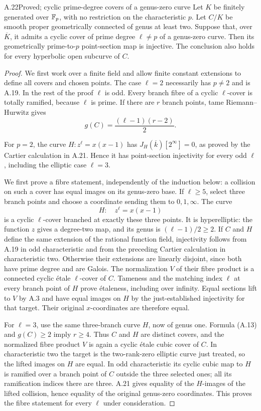 \begin{claim}{A.22}{Proved; cyclic prime-degree covers of a genus-zero curve}
Let $K$ be finitely generated over $\mathbb F_p$, with no restriction
on the characteristic $p$.
Let $C/K$ be smooth proper geometrically connected of genus
at least two. Suppose that, over $\overline K$, it admits a
cyclic cover of prime degree $\ell\ne p$ of a genus-zero
curve. Then its geometrically prime-to-$p$ point-section map
is injective. The conclusion also holds for every hyperbolic
open subcurve of $C$.
\end{claim}
\begin{proof}
We first work over a finite field and allow finite constant
extensions to define all covers and chosen points. The case
$\ell=2$ necessarily has $p\ne2$ and is A.19. In the rest
of the proof $\ell$ is odd.
Every branch fibre of a cyclic $\ell$-cover is totally
ramified, because $\ell$ is prime. If there are $r$ branch
points, tame Riemann--Hurwitz gives
\[
 g(C)=\frac{(\ell-1)(r-2)}2.                                  \tag{A.13}
\]

For $p=2$, the curve $H:z^\ell=x(x-1)$ has
$J_H(\overline k)[2^\infty]=0$, as proved by the Cartier
calculation in A.21. Hence it has point-section
injectivity for every odd $\ell$, including the elliptic
case $\ell=3$.

We first prove a fibre statement, independently of the
induction below: a collision on such a cover has equal
images on its genus-zero base. If $\ell\ge5$, select three
branch points and choose a coordinate sending them to
$0,1,\infty$. The curve
\[
 H:\quad z^\ell=x(x-1)
\]
is a cyclic $\ell$-cover branched at exactly these three
points. It is hyperelliptic: the function $z$ gives a
degree-two map, and its genus is $(\ell-1)/2\ge2$.
If $C$ and $H$ define the same extension of the rational
function field, injectivity follows from A.19 in odd
characteristic and from the preceding Cartier calculation
in characteristic two.
Otherwise their extensions are linearly disjoint, since
both have prime degree and are Galois. The normalization
$V$ of their fibre product is a connected cyclic \'etale
$\ell$-cover of $C$. Tameness and the matching index
$\ell$ at every branch point of $H$ prove \'etaleness,
including over infinity. Equal sections lift to $V$ by
A.3 and have equal images on $H$ by the just-established
injectivity for that target. Their original
$x$-coordinates are therefore equal.

For $\ell=3$, use the same three-branch curve $H$, now of
genus one. Formula (A.13) and $g(C)\ge2$ imply $r\ge4$.
Thus $C$ and $H$ are distinct covers, and the normalized
fibre product $V$ is again a cyclic \'etale cubic cover of
$C$. In characteristic two the target is the
two-rank-zero elliptic curve just treated, so the lifted
images on $H$ are equal. In odd characteristic its cyclic
cubic map to $H$ is ramified over a branch
point of $C$ outside the three selected ones; all its
ramification indices there are three. A.21 gives equality
of the $H$-images of the lifted collision, hence equality
of the original genus-zero coordinates. This proves the
fibre statement for every $\ell$ under consideration.


\end{proof}
